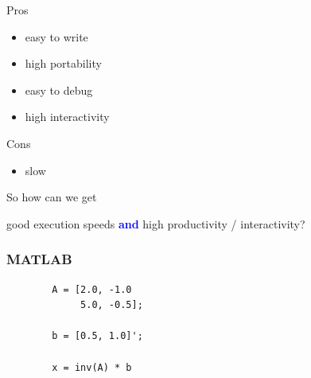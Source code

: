 \documentclass[
    xcolor={svgnames,dvipsnames},
    hyperref={colorlinks, citecolor=DeepPink4, linkcolor=DarkRed, urlcolor=DarkBlue}
    ]{beamer}  %
\newcommand{\navy}[1]{\textcolor{Blue}{\bf #1}}
\newcommand{\1}{\mathbbm 1}
\begin{document}
\begin{frame}

    Pros

    \begin{itemize}
        \item easy to write
        \item high portability
        \item easy to debug
        \item high interactivity
    \end{itemize}

    \vspace{0.5em}

    Cons

    \begin{itemize}
        \item slow
    \end{itemize}

\end{frame}


\begin{frame}
    
    So how can we get 

    \begin{center}
    good execution speeds \navy{and} high productivity / interactivity?
    \end{center}

\end{frame}



\begin{frame}[fragile]
    \frametitle{MATLAB}

    \begin{verbatim}
        A = [2.0, -1.0
             5.0, -0.5];

        b = [0.5, 1.0]';

        x = inv(A) * b
    \end{verbatim}


\end{frame}
\end{document}
